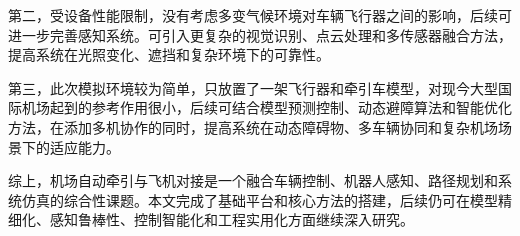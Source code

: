 第二，受设备性能限制，没有考虑多变气候环境对车辆飞行器之间的影响，后续可进一步完善感知系统。可引入更复杂的视觉识别、点云处理和多传感器融合方法，提高系统在光照变化、遮挡和复杂环境下的可靠性。

第三，此次模拟环境较为简单，只放置了一架飞行器和牵引车模型，对现今大型国际机场起到的参考作用很小，后续可结合模型预测控制、动态避障算法和智能优化方法，在添加多机协作的同时，提高系统在动态障碍物、多车辆协同和复杂机场场景下的适应能力\cite{ref20,ref25,ref28}。

综上，机场自动牵引与飞机对接是一个融合车辆控制、机器人感知、路径规划和系统仿真的综合性课题。本文完成了基础平台和核心方法的搭建，后续仍可在模型精细化、感知鲁棒性、控制智能化和工程实用化方面继续深入研究。
